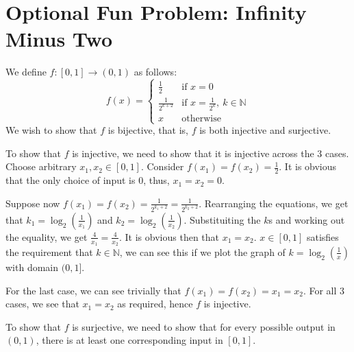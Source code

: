 \documentclass{article}
\renewcommand{\(}{\left(}
\renewcommand{\)}{\right)}
\theoremstyle{plain}
\theoremstyle{plain}
\theoremstyle{definition}
\begin{document}
\section*{Optional Fun Problem: Infinity Minus Two}
\begin{shaded}
    We define $f:[0,1]\to (0,1)$ as follows:
    \[
        f(x) = 
        \begin{cases}
           \frac{1}{2} & \text{if } x = 0 \\
           \frac{1}{2^{k+2}} & \text{if } x = \frac{1}{2^{k}},\ k\in\mathbb{N} \\
           x & \text{otherwise}
        \end{cases}
    \]
    We wish to show that $f$ is bijective, that is, $f$ is both injective and surjective.

    \vspace{4mm}

    To show that $f$ is injective, we need to show that it is injective across the 3 cases. Choose arbitrary $x_{1},x_{2}\in[0,1]$. Consider $f(x_{1})=f(x_{2})=\frac{1}{2}$. It is obvious that the only choice of input is 0, thus, $x_{1}=x_{2}=0$.

    \vspace{4mm}

    Suppose now $f(x_{1})=f(x_{2})=\frac{1}{2^{k_{1}+2}}=\frac{1}{2^{k_{2}+2}}$. Rearranging the equations, we get that $k_{1}=\log_{2}(\frac{1}{x_{1}})$ and $k_{2}=\log_{2}(\frac{1}{x_{2}})$. Substituiting the $k$s and working out the equality, we get $\frac{4}{x_{1}}=\frac{4}{x_{2}}$. It is obvious then that $x_{1}=x_{2}$. $x\in[0,1]$ satisfies the requirement that $k\in\mathbb{N}$, we can see this if we plot the graph of $k=\log_{2}(\frac{1}{x})$ with domain $(0,1]$.

    \vspace{4mm}

    For the last case, we can see trivially that $f(x_{1})=f(x_{2})=x_{1}=x_{2}$. For all 3 cases, we see that $x_{1}=x_{2}$ as required, hence $f$ is injective.

    \vspace{4mm}

    To show that $f$ is surjective, we need to show that for every possible output in $(0,1)$, there is at least one corresponding input in $[0,1]$.

    \vspace{4mm}


\end{shaded}
\end{document}

